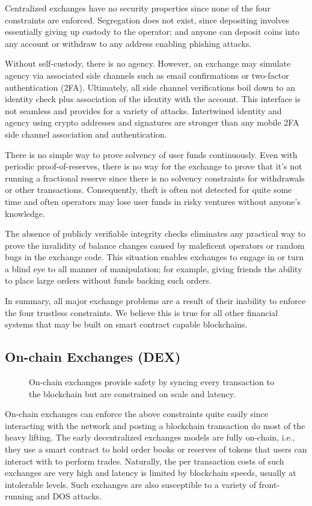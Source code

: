 \documentclass[12pt,a4paper]{article}
\begin{document}
Centralized exchanges have no security properties since none of the four constraints are enforced. Segregation does not exist, since depositing involves essentially giving up custody to the operator; and anyone can deposit coins into any account or withdraw to any address enabling phishing attacks. 

Without self-custody, there is no agency. However, an exchange may simulate agency via associated side channels such as email confirmations or two-factor authentication (2FA). Ultimately, all side channel verifications boil down to an identity check plus association of the identity with the account. This interface is not seamless and provides for a variety of attacks. Intertwined identity and agency using crypto addresses and signatures are stronger than any mobile 2FA side channel association and authentication\cite{DLRS14}. 

There is no simple way to prove solvency of user funds continuously. Even with periodic proof-of-reserves, there is no way for the exchange to prove that it’s not running a fractional reserve since there is no solvency constraints for withdrawals or other transactions. Consequently, theft is often not detected for quite some time and often operators may lose user funds in risky ventures without anyone’s knowledge.

The absence of publicly verifiable integrity checks eliminates any practical way to prove the invalidity of balance changes caused by maleficent operators or random bugs in the exchange code. This situation enables exchanges to engage in or turn a blind eye to all manner of manipulation; for example, giving friends the ability to place large orders without funds backing such orders.

In summary, all major exchange problems are a result of their inability to enforce the four trustless constraints. We believe this is true for all other financial systems that may be built on smart contract capable blockchains.

\subsection{On-chain Exchanges (DEX)}
\begin{figure}[ht]
\begin{center}

\end{center}
\caption{On-chain exchanges provide safety by syncing every transaction to the blockchain but are constrained on scale and latency. }
\end{figure}
On-chain exchanges can enforce the above constraints quite easily since interacting with the network and posting a blockchain transaction do most of the heavy lifting.
The early decentralized exchanges models are fully on-chain, i.e., they use a smart contract to hold order books or reserves of tokens that users can interact with to perform trades. Naturally, the per transaction costs of such exchanges are very high and latency is limited by blockchain speeds, usually at intolerable levels. Such exchanges are also susceptible to a variety of front-running and DOS attacks\cite{levprotocol}.
\end{document}

